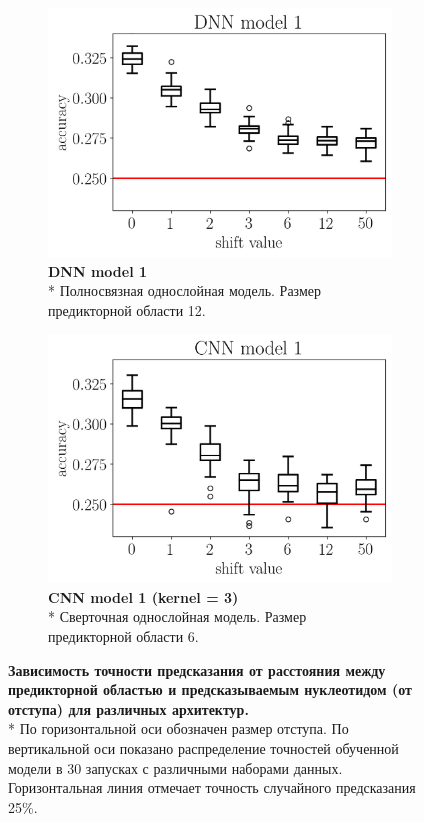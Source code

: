 \begin{figure}[h] %
	\centering
	\begin{subfigure}[t]{0.47\linewidth}
		\includegraphics[width = \textwidth]{pics/dnn_model_1_all_runs_p1_ecoli_100000_10000_12_all.png}
		\caption{{\bfseries DNN model 1} \\*
		Полносвязная однослойная модель. Размер предикторной области 12.
		}
		\label{fig:dnn_shift}
	\end{subfigure}
	\begin{subfigure}[t]{0.47\linewidth}
		\includegraphics[width = \textwidth]{pics/cnn_model_1_all_runs_p1_ecoli_100000_10000_6_all.png}
		\caption{{\bfseries CNN model 1 (kernel = 3)} \\*
		Сверточная однослойная модель. Размер предикторной области 6.
		}
		\label{fig:cnn_shift}
	\end{subfigure}
	\caption{{\bfseries Зависимость точности предсказания от расстояния между предикторной областью и предсказываемым нуклеотидом (от отступа)  для различных архитектур.} \\*
	По горизонтальной оси обозначен размер отступа. По вертикальной оси показано распределение точностей обученной модели в 30 запусках с различными наборами данных. Горизонтальная линия отмечает точность случайного предсказания 25\%.}	
	\label{fig:shift}
	
\end{figure}